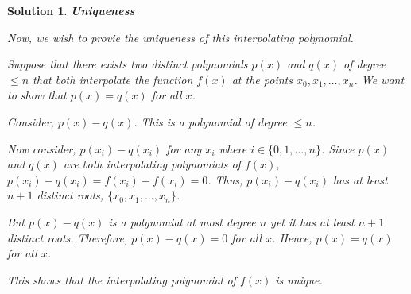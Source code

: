 \documentclass[12pt, letterpaper]{article}
\theoremstyle{nonumberplain}
\newtheorem{sol}{Solution}
\begin{document}
\begin{sol}
	\medskip

	\textbf{Uniqueness}

	Now, we wish to provie the uniqueness of this interpolating polynomial.

	Suppose that there exists two distinct polynomials $p(x)$ and $q(x)$ of degree $\leq n$ that both interpolate the function $f(x)$ at the points $x_0, x_1, \ldots, x_n$. We want to show that $p(x) = q(x)$ for all $x$.

	Consider, $p(x) - q(x)$. This is a polynomial of degree $\leq n$.

	Now consider, $p(x_i) - q(x_i)$ for any $x_i$ where $i \in \{0, 1, \ldots, n\}$. Since $p(x)$ and $q(x)$ are both interpolating polynomials of $f(x)$, $p(x_i) - q(x_i) = f(x_i) - f(x_i) = 0$. Thus, $p(x_i) - q(x_i)$ has at least $n+1$ distinct roots, $\{x_0, x_1, \ldots, x_n\}$.

	But $p(x) - q(x)$ is a polynomial at most degree $n$ yet it has at least $n+1$ distinct roots. Therefore, $p(x) - q(x) = 0$ for all $x$. Hence, $p(x) = q(x)$ for all $x$.

	This shows that the interpolating polynomial of $f(x)$ is unique.

\end{sol}

\newpage
\end{document}
